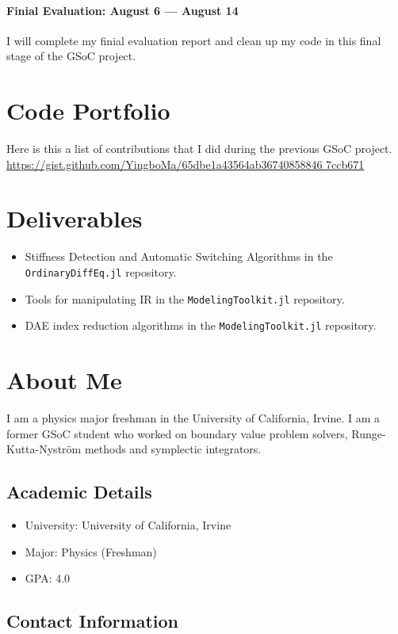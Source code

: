 \documentclass[12pt,a4paper]{article}
\begin{document}
\paragraph{Finial Evaluation: August 6 --- August 14}
I will complete my finial evaluation report and clean up my code in this final
stage of the GSoC project.

\section{Code Portfolio}
Here is this a list of contributions that I did during the previous GSoC
project. \url{https://gist.github.com/YingboMa/65dbe1a43564ab36740858846
7ccb671}

\section{Deliverables}
\begin{itemize}
  \item Stiffness Detection and Automatic Switching Algorithms in
    the \texttt{OrdinaryDiffEq.jl} repository.
  \item Tools for manipulating IR in the \texttt{ModelingToolkit.jl}
    repository.
  \item DAE index reduction algorithms in the \texttt{ModelingToolkit.jl}
    repository.
\end{itemize}

\section{About Me}
I am a physics major freshman in the University of California, Irvine. I am a
former GSoC student who worked on boundary value problem solvers,
Runge-Kutta-Nystr{\"o}m methods and symplectic integrators.

\subsection{Academic Details}
\begin{itemize}
  \item University: University of California, Irvine
  \item Major: Physics (Freshman)
  \item GPA: 4.0
\end{itemize}

\subsection{Contact Information}
\end{document}
